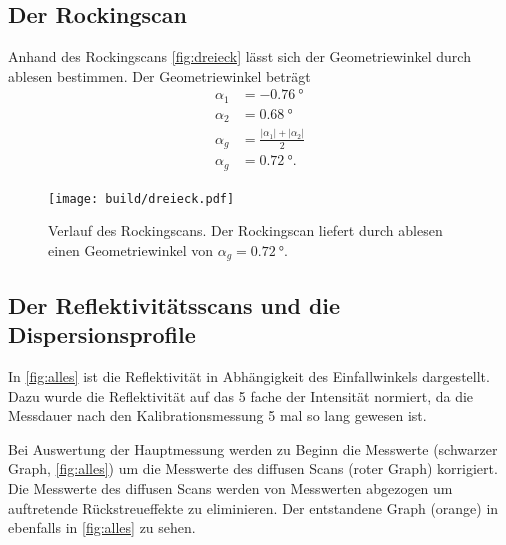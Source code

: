 \subsection{Der Rockingscan}

Anhand des Rockingscans \autoref{fig:dreieck} lässt sich der Geometriewinkel durch ablesen bestimmen.
Der Geometriewinkel beträgt
\begin{align*}
    \alpha_1 &= \SI{-0.76}{\degree}\\    
    \alpha_2 &= \SI{0.68}{\degree}\\    
    \alpha_g &= \frac{|\alpha_1|+|\alpha_2|}{2}\\
    \alpha_g &= \SI{0.72}{\degree}.    
\end{align*}
\begin{figure}
    \centering
    \texttt{[image: build/dreieck.pdf]}
    \caption{Verlauf des Rockingscans. Der Rockingscan liefert durch ablesen einen Geometriewinkel von $\alpha_g = \SI{0.72}{\degree}$.}
    \label{fig:dreieck}
\end{figure}

\subsection{Der Reflektivitätsscans und die Dispersionsprofile}
In \autoref{fig:alles} ist die Reflektivität in Abhängigkeit des Einfallwinkels dargestellt.
Dazu wurde die Reflektivität auf das 5 fache der Intensität normiert, da die Messdauer nach den Kalibrationsmessung 5 mal so lang gewesen ist. 

Bei Auswertung der Hauptmessung werden zu Beginn die Messwerte (schwarzer Graph, \autoref{fig:alles}) um die Messwerte des
diffusen Scans (roter Graph) korrigiert. Die Messwerte des diffusen Scans werden von Messwerten abgezogen um auftretende Rückstreueffekte zu 
eliminieren. Der entstandene Graph (orange) in ebenfalls in \autoref{fig:alles} zu sehen. 

